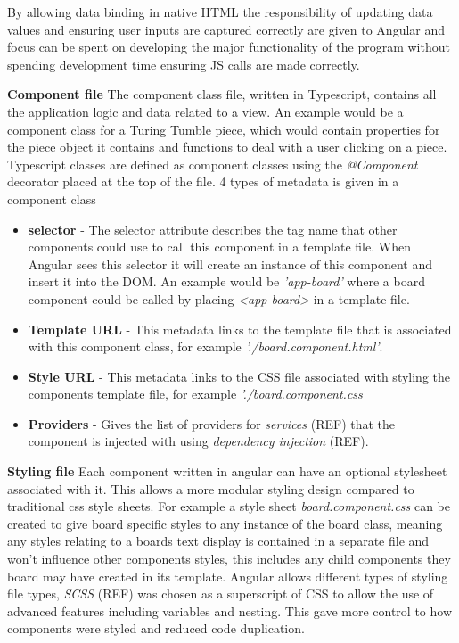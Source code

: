 \documentclass{l4proj}
\begin{document}
By allowing data binding in native HTML the responsibility of updating data values and ensuring user inputs are captured correctly are given to Angular and focus can be spent on developing the major functionality of the program without spending development time ensuring JS calls are made correctly. 

\textbf{Component file}
The component class file, written in Typescript, contains all the application logic and data related to a view. An example would be a component class for a Turing Tumble piece, which would contain properties for the piece object it contains and functions to deal with a user clicking on a piece. Typescript classes are defined as component classes using the \emph{@Component} decorator placed at the top of the file. 4 types of metadata is given in a component class
\begin{itemize}
    \item \textbf{selector} - The selector attribute describes the tag name that other components could use to call this component in a template file. When Angular sees this selector it will create an instance of this component and insert it into the DOM. An example would be \emph{'app-board'} where a board component could be called by placing \emph{<app-board>} in a template file.
    \item \textbf{Template URL} - This metadata links to the template file that is associated with this component class, for example \emph{'./board.component.html'}.
    \item \textbf{Style URL} - This metadata links to the CSS file associated with styling the components template file, for example \emph{'./board.component.css}
    \item \textbf{Providers} - Gives the list of providers for \emph{services} (REF) that the component is injected with using \emph{dependency injection} (REF). 
\end{itemize}

\textbf{Styling file}
Each component written in angular can have an optional stylesheet associated with it. This allows a more modular styling design compared to traditional css style sheets. For example a style sheet \emph{board.component.css} can be created to give board specific styles to any instance of the board class, meaning any styles relating to a boards text display is contained in a separate file and won't influence other components styles, this includes any child components they board may have created in its template. Angular allows different types of styling file types, \emph{SCSS} (REF) was chosen as a superscript of CSS to allow the use of advanced features including variables and nesting. This gave more control to how components were styled and reduced code duplication.
\end{document}
